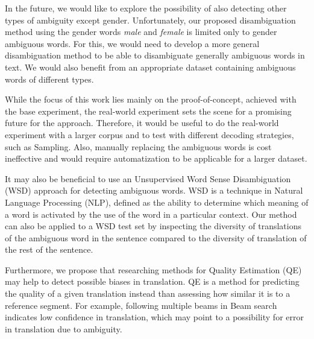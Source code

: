 In the future, we would like to explore the possibility of also detecting other types of ambiguity except gender. Unfortunately, our proposed disambiguation method using the gender words \textit{male} and \textit{female} is limited only to gender ambiguous words. For this, we would need to develop a more general disambiguation method to be able to disambiguate generally ambiguous words in text. We would also benefit from an appropriate dataset containing ambiguous words of different types. 

While the focus of this work lies mainly on the proof-of-concept, achieved with the base experiment, the real-world experiment sets the scene for a promising future for the approach. Therefore, it would be useful to do the real-world experiment with a larger corpus and to test with different decoding strategies, such as Sampling. Also, manually replacing the ambiguous words is cost ineffective and would require automatization to be applicable for a larger dataset.

It may also be beneficial to use an Unsupervised Word Sense Disambiguation (WSD) approach for detecting ambiguous words. WSD is a technique in Natural Language Processing (NLP), defined as the ability to determine which meaning of a word is activated by the use of the word in a particular context. Our method can also be applied to a WSD test set by inspecting the diversity of translations of the ambiguous word in the sentence compared to the diversity of translation of the rest of the sentence. 

Furthermore, we propose that researching methods for Quality Estimation (QE) may help to detect possible biases in translation. QE is a method for predicting the quality of a given translation instead than assessing how similar it is to a reference segment. For example, following multiple beams in Beam search indicates low confidence in translation, which may point to a possibility for error in translation due to ambiguity.

